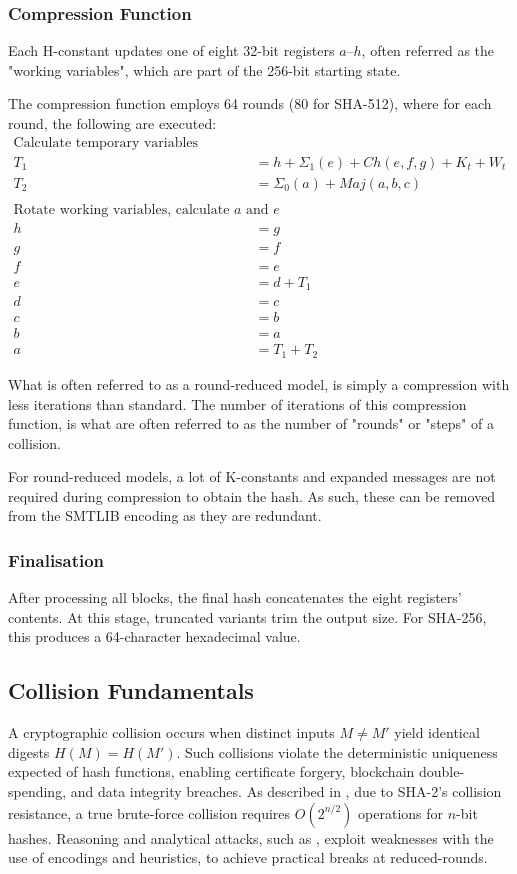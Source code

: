\documentclass[a4paper]{report}
\begin{document}
\subsubsection{Compression Function}
\label{ssec:sha2-compression-function}
Each H-constant updates one of eight 32-bit registers $a$–$h$, often referred as the "working variables", which are part of the 256-bit starting state.

The compression function employs 64 rounds (80 for SHA-512), where for each round, the following are executed:
\begin{equation}
	\begin{aligned}
		\text{Calculate temporary variables} \\
		T_1 &= h + \Sigma_1(e) + Ch(e,f,g) + K_t + W_t \\
		T_2 &= \Sigma_0(a) + Maj(a,b,c) \\
		\\
		\text{Rotate working variables, calculate $a$ and $e$} \\
		h &= g \\
		g &= f \\
		f &= e \\
		e &= d + T_1 \\
		d &= c \\
		c &= b \\
		b &= a \\
		a &= T_1 + T_2
	\end{aligned}
\end{equation}

What is often referred to as a round-reduced model, is simply a compression with less iterations than standard.
The number of iterations of this compression function, is what are often referred to as the number of "rounds" or "steps" of a collision.

For round-reduced models, a lot of K-constants and expanded messages are not required during compression to obtain the hash.
As such, these can be removed from the SMTLIB encoding as they are redundant.

\subsubsection{Finalisation}
After processing all blocks, the final hash concatenates the eight registers' contents.
At this stage, truncated variants trim the output size.
For SHA-256, this produces a 64-character hexadecimal value.

\subsection{Collision Fundamentals}
A cryptographic collision occurs when distinct inputs $M \neq M'$ yield identical digests $H(M) = H(M')$.
Such collisions violate the deterministic uniqueness expected of hash functions, enabling certificate forgery, blockchain double-spending, and data integrity breaches.
As described in \cite{NIST_SP_800_107}, due to SHA-2's collision resistance, a true brute-force collision requires $O(2^{n/2})$ operations for $n$-bit hashes.
Reasoning and analytical attacks, such as \cite{li_2024}, exploit weaknesses with the use of encodings and heuristics, to achieve practical breaks at reduced-rounds.
\end{document}
